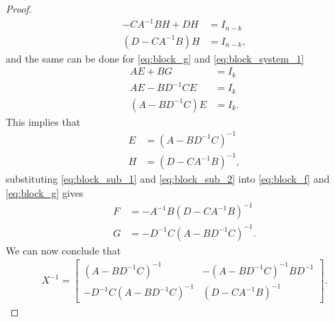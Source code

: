\begin{proof}
    \begin{align*}
        -CA^{-1}BH + DH &= I_{n-k} \\
        (D - CA^{-1}B)H &= I_{n-k},
    \end{align*}
    and the same can be done for \eqref{eq:block_g} and \eqref{eq:block_system_1}
    \begin{align*}
        AE + BG &= I_k \\
        AE - BD^{-1}CE &= I_k \\
        (A - BD^{-1}C)E &= I_k.
    \end{align*}
    This implies that
    \begin{align}
        E &= (A - BD^{-1}C)^{-1} \label{eq:block_sub_1} \\
        H &= (D - CA^{-1}B)^{-1}, \label{eq:block_sub_2}
    \end{align}
    substituting \eqref{eq:block_sub_1} and \eqref{eq:block_sub_2} into \eqref{eq:block_f} and \eqref{eq:block_g} gives
    \begin{align*}
        F &= -A^{-1}B(D - CA^{-1}B)^{-1} \\
        G &= -D^{-1}C(A - BD^{-1}C)^{-1}.
    \end{align*}
    We can now conclude that
    \begin{align*}
        X^{-1} =
        \begin{bmatrix}
            (A - BD^{-1}C)^{-1} &
            -(A - BD^{-1}C)^{-1}BD^{-1} \\
            -D^{-1}C(A - BD^{-1}C)^{-1} &
            (D - CA^{-1}B)^{-1}
        \end{bmatrix}.
    \end{align*}
\end{proof}

